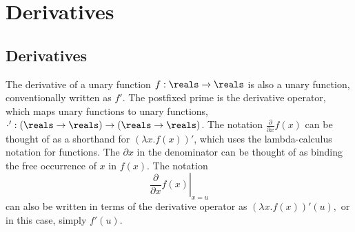 \documentclass[10pt]{article}
\begin{document}










\clearpage
\appendix

\section{Derivatives}\label{derivative-definitions.section}

\subsection{Derivatives}

The derivative of a unary function $f:\reals \rightarrow \reals$ is
also a unary function, conventionally written as $f'$.  The postfixed prime is
the derivative operator, which maps unary functions to unary
functions, $\cdot' : \left(\reals \rightarrow \reals\right)
\rightarrow \left(\reals \rightarrow \reals\right)$.  The notation
$\frac{\partial}{\partial x} f(x)$ can be thought of as a shorthand
for $\left( \lambda x. f(x) \right)'$, which uses the lambda-calculus
notation for functions. The $\partial x$ in the denominator can be
thought of as binding the free occurrence of $x$ in $f(x)$.  The
notation
\[
\left. \frac{\partial}{\partial x} f(x) \right|_{x = u}
\]
can also be written in terms of the derivative operator as $\left(
  \lambda x. f(x) \right)'(u),$ or in this case, simply $f'(u)$.
\end{document}
